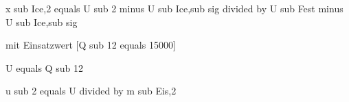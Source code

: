 x sub Ice,2 equals U sub 2 minus U sub Ice,sub sig divided by U sub Fest minus U sub Ice,sub sig  

mit Einsatzwert [Q sub 12 equals 15000]  

U equals Q sub 12  

u sub 2 equals U divided by m sub Eis,2